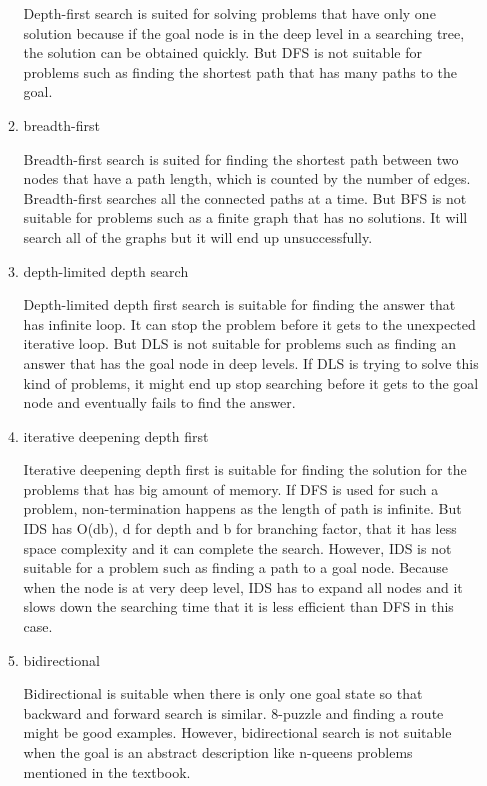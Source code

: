 \documentclass[12pt]{article}
\begin{document}
\begin{enumerate}
\begin{enumerate}
  Depth-first search is suited for solving problems that have only one solution because if the goal node is in the deep level in a searching tree, the solution can be obtained quickly. But DFS is not suitable for problems such as finding the shortest path that has many paths to the goal.

  \item breadth-first

  Breadth-first search is suited for finding the shortest path between two nodes that have a path length, which is counted by the number of edges. Breadth-first searches all the connected paths at a time. But BFS is not suitable for problems such as a finite graph that has no solutions. It will search all of the graphs but it will end up unsuccessfully. 
  
  \item depth-limited depth search 
  
  Depth-limited depth first search is suitable for finding the answer that has infinite loop. It can stop the problem before it gets to the unexpected iterative loop. But DLS is not suitable for problems such as finding an answer that has the goal node in deep levels. If DLS is trying to solve this kind of problems, it might end up stop searching before it gets to the goal node and eventually fails to find the answer.
  
  \item iterative deepening depth first
  
  Iterative deepening depth first is suitable for finding the solution for the problems that has big amount of memory. If DFS is used for such a problem, non-termination happens as the length of path is infinite. But IDS has O(db), d for depth and b for branching factor, that it has less space complexity and it can complete the search. However, IDS is not suitable for a problem such as finding a path to a goal node. Because when the node is at very deep level, IDS has to expand all nodes and it slows down the searching time that it is less efficient than DFS in this case.
  
  \item bidirectional
  
  Bidirectional is suitable when there is only one goal state so that backward and forward search is similar. 8-puzzle and finding a route might be good examples. However, bidirectional search is not suitable when the goal is an abstract description like n-queens problems mentioned in the textbook.
  

\end{enumerate}
\end{enumerate}
\end{document}
